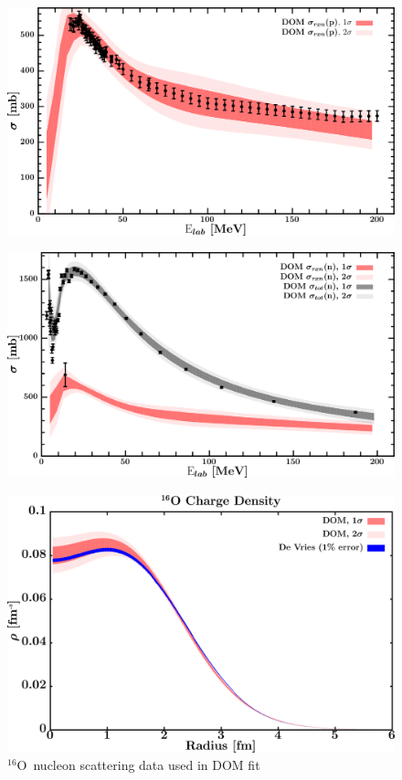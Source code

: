 \documentclass[twocolumn,secnumarabic,amssymb, nobibnotes, aps, prl,
superscriptaddress, nobalancelastpage]{revtex4}
\newcommand{\oSix}{\ensuremath{^{16}}O}
\begin{document}
\begin{figure}[!htb]
\begin{minipage}{0.4\linewidth}
        \label{DOM_o16_neutron_elastic}
    \end{minipage}
    \centering
    \begin{minipage}{0.4\linewidth}
        \centering
        \includegraphics[width=\linewidth]{figures/o16_protonInelastic.png}
        \label{DOM_o16_proton_inelastic}
    \end{minipage}\hspace{6pt}
    \begin{minipage}{0.4\linewidth}
        \centering
        \includegraphics[width=\linewidth]{figures/o16_neutronInelastic.png}
        \label{DOM_o16_neutron_inelastic}
    \end{minipage}
    \caption{\oSix\ nucleon scattering data used in DOM fit}
    \label{DOM_o16_scattering}
    \centering
    \begin{minipage}{0.4\linewidth}
        \centering
        \includegraphics[width=\linewidth]{figures/o16_chargeDensity.png}

\end{minipage}
\end{figure}
\end{document}
